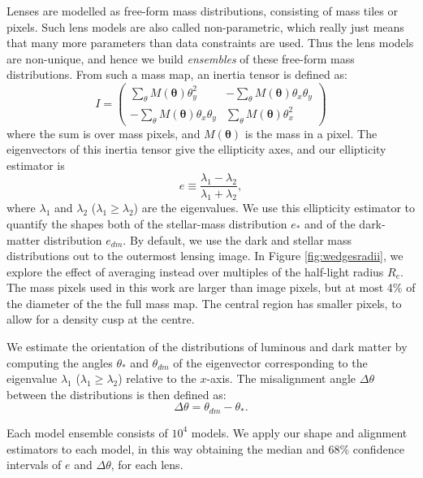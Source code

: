 \documentclass[useAMS,usenatbib]{mn2e}
\begin{document}
Lenses are modelled as free-form mass distributions, consisting of mass tiles or pixels. Such lens models are also called non-parametric, which really just means that many more parameters than data constraints are used. Thus the lens models are non-unique, and hence we build {\it ensembles} of these free-form mass distributions. From such a mass map, an inertia tensor is defined as:
\begin{equation}\label{eq:inertiatensor}
I = 
\begin{pmatrix}
 \sum_\theta M(\boldsymbol{\theta})\theta^{2}_{y} & -\sum_\theta M(\boldsymbol{\theta})\theta_{x}\theta_{y} \\
-\sum_\theta M(\boldsymbol{\theta})\theta_{x}\theta_{y} & \sum_\theta M(\boldsymbol{\theta})\theta^{2}_{x}
\end{pmatrix}
\end{equation}
where the sum is over mass pixels, and $M(\boldsymbol{\theta})$ is the mass in a pixel. The eigenvectors of this inertia tensor give the ellipticity axes, and our ellipticity estimator is
\begin{equation}\label{eq:shapeestimate}
    e \equiv \frac{\lambda_{1}-\lambda_{2}}{\lambda_{1}+\lambda_{2}},
\end{equation}
where $\lambda_{1}$ and $\lambda_{2}$ ($\lambda_{1} \geq \lambda_{2}$) are the eigenvalues. We use this ellipticity estimator to quantify the shapes both of the stellar-mass distribution $e_*$ and of the dark-matter distribution $e_{dm}$. By default, we use the dark and stellar mass distributions out to the outermost lensing image. In Figure \ref{fig:wedgesradii}, we explore the effect of averaging instead over multiples of the half-light radius $R_e$. The mass pixels used in this work are larger than image pixels, but at most 4\% of the diameter of the the full mass map. The central region has smaller pixels, to allow for a density cusp at the centre.

We estimate the orientation of the distributions of luminous and dark matter by computing the angles $\theta_{*}$ and $\theta_{dm}$ of the eigenvector corresponding to the eigenvalue $\lambda_{1}$ ($\lambda_{1} \geq \lambda_{2}$) relative to the $x$-axis. The misalignment angle $\Delta\theta$ between the distributions is then defined as:
\begin{equation}\label{eq:misalignment}
  \Delta\theta = \theta_{dm} - \theta_{*}.
\end{equation}

Each model ensemble consists of $10^4$ models. We apply our shape and alignment estimators to each model, in this way obtaining the median and 68\% confidence intervals of $e$ and $\Delta \theta$, for each lens.
\end{document}
